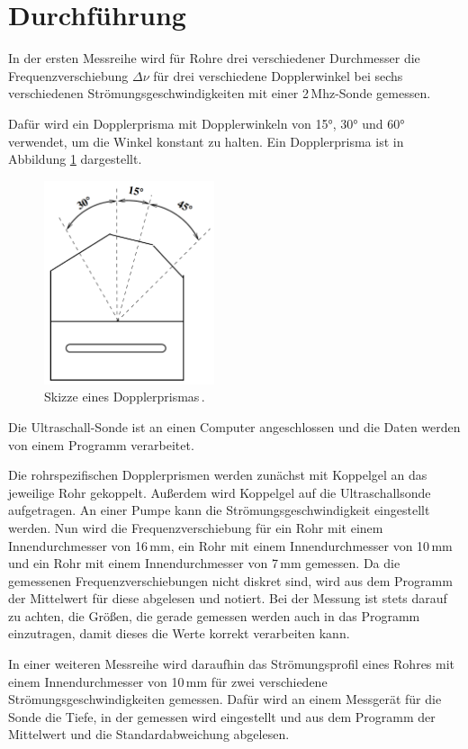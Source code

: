 \section{Durchführung}
\label{sec:Durchführung}

In der ersten Messreihe wird für Rohre drei verschiedener Durchmesser die
Frequenzverschiebung $\Delta \nu$ für drei verschiedene Dopplerwinkel
bei sechs verschiedenen Strömungsgeschwindigkeiten mit einer 2\,Mhz-Sonde gemessen.

Dafür wird ein Dopplerprisma mit Dopplerwinkeln von 15°, 30° und 60° verwendet,
um die Winkel konstant zu halten. Ein Dopplerprisma ist in Abbildung \ref{fig:dopplerprisma}
dargestellt.
\begin{figure}
  \centering
  \includegraphics[width=5cm]{data/dopplerprisma.png}
  \caption{Skizze eines Dopplerprismas\,\cite{Versuchsanleitung}.}
  \label{fig:dopplerprisma}
\end{figure}
Die Ultraschall-Sonde ist an einen Computer angeschlossen und die Daten werden
von einem Programm verarbeitet.

Die rohrspezifischen Dopplerprismen werden zunächst mit Koppelgel an das jeweilige
Rohr gekoppelt. Außerdem wird Koppelgel auf die Ultraschallsonde aufgetragen.
An einer Pumpe kann die Strömungsgeschwindigkeit eingestellt werden. Nun wird
die Frequenzverschiebung für ein
Rohr mit einem Innendurchmesser von 16\,mm, ein Rohr mit einem Innendurchmesser von
10\,mm und ein Rohr mit einem Innendurchmesser von 7\,mm gemessen. Da die gemessenen
Frequenzverschiebungen nicht diskret sind, wird aus dem Programm der Mittelwert
für diese abgelesen und notiert. Bei der Messung ist stets darauf zu achten, die
Größen, die gerade gemessen werden auch in das Programm einzutragen, damit dieses
die Werte korrekt verarbeiten kann.

In einer weiteren Messreihe wird daraufhin das Strömungsprofil eines Rohres mit
einem Innendurchmesser von 10\,mm für zwei verschiedene Strömungsgeschwindigkeiten
gemessen. Dafür wird an einem Messgerät für die Sonde die Tiefe, in der gemessen wird
eingestellt und aus dem Programm der Mittelwert und die Standardabweichung abgelesen.
